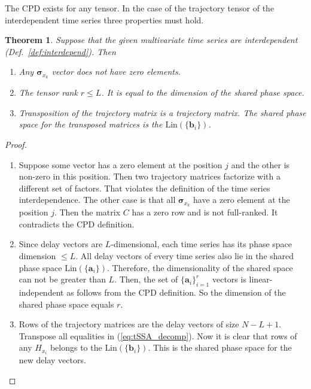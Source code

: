 \documentclass[referee, pdflatex, sn-mathphys-num]{sn-jnl}
\theoremstyle{definition}
\theoremstyle{plain}
\newtheorem{Th}{Theorem}
\begin{document}
	The CPD exists for any tensor. In the case of the trajectory tensor of the interdependent time series three properties must hold.
	
	\begin{Th}\label{th:cpd_phase}
		Suppose that the given multivariate time series are interdependent (Def.~{\ref{def:interdepend}}). Then
		
		\begin{enumerate}
			\item Any $ \boldsymbol{\sigma}_{x_k} $ vector does not have zero elements.
			\item The tensor rank $ r \le L $. It is equal to the dimension of the shared phase space.
			\item Transposition of the trajectory matrix is a trajectory matrix. The shared phase space for the transposed matrices is the $ \text{Lin}(\{\mathbf{b}_i\}) $.
		\end{enumerate}
	\end{Th}
	
	\begin{proof}
		\begin{enumerate}
			\item Suppose some vector has a zero element at the position $ j $ and the other is non-zero in this position. Then two trajectory matrices factorize with a different set of factors. That violates the definition of the time series interdependence. The other case is that all $ \boldsymbol{\sigma}_{x_k} $ have a zero element at the position $ j $. Then the matrix $ C $ has a zero row and is not full-ranked. It contradicts the CPD definition.
			\item Since delay vectors are $ L $-dimensional, each time series has its phase space dimension $ \le L $. All delay vectors of every time series also lie in the shared phase space $ \text{Lin}(\{\mathbf{a}_i\}) $. Therefore, the dimensionality of the shared space can not be greater than $ L $. Then, the set of $ \{\mathbf{a}_i\}_{i=1}^r $ vectors is linear-independent as follows from the CPD definition. So the dimension of the shared phase space equals $ r $.
			\item Rows of the trajectory matrices are the delay vectors of size $ N - L + 1 $. Transpose all equalities in (\ref{eq:tSSA_decomp}). Now it is clear that rows of any $ H_{x_i} $ belongs to the $ \text{Lin}(\{\mathbf{b}_i\}) $. This is the shared phase space for the new delay vectors.
		\end{enumerate}
	\end{proof}
\end{document}
